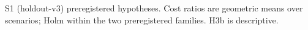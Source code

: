 \begin{table}[htbp]\centering\small
\caption{S1 (holdout-v3) preregistered hypotheses. Cost ratios are geometric means over scenarios; Holm within the two
preregistered families. H3b is descriptive.}\label{tab:s1hyp}
\end{table}
